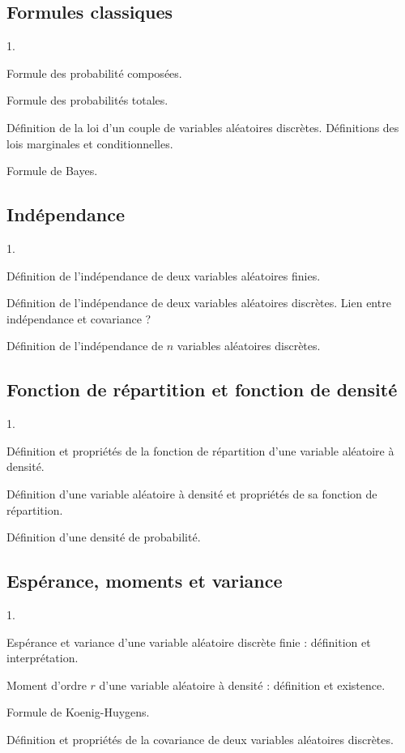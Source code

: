 \documentclass[11pt]{article}%
\begin{document}
\subsection*{Formules classiques}

\begin{noliste}{1.}
\item Formule des probabilité composées.
\item Formule des probabilités totales.
\item Définition de la loi d'un couple de variables aléatoires
  discrètes. Définitions des lois marginales et conditionnelles.
\item Formule de Bayes.
\end{noliste}

\subsection*{Indépendance}

\begin{noliste}{1.}
\item Définition de l'indépendance de deux variables aléatoires finies.
\item Définition de l'indépendance de deux variables aléatoires
  discrètes. Lien entre indépendance et covariance ?
\item Définition de l'indépendance de $n$ variables aléatoires discrètes.
\end{noliste}


\subsection*{Fonction de répartition et fonction de densité}

\begin{noliste}{1.}
\item Définition et propriétés de la fonction de répartition d'une
  variable aléatoire à densité.
\item Définition d'une variable aléatoire à densité et propriétés de
  sa fonction de répartition.
\item Définition d'une densité de probabilité.
\end{noliste}

\subsection*{Espérance, moments et variance}


\begin{noliste}{1.}
\item Espérance et variance d'une variable aléatoire discrète finie :
  définition et interprétation.
\item Moment d'ordre $r$ d'une variable aléatoire à densité :
  définition et existence.
\item Formule de Koenig-Huygens.
\item Définition et propriétés de la covariance de deux variables
  aléatoires discrètes.
\end{noliste}
\end{document}

